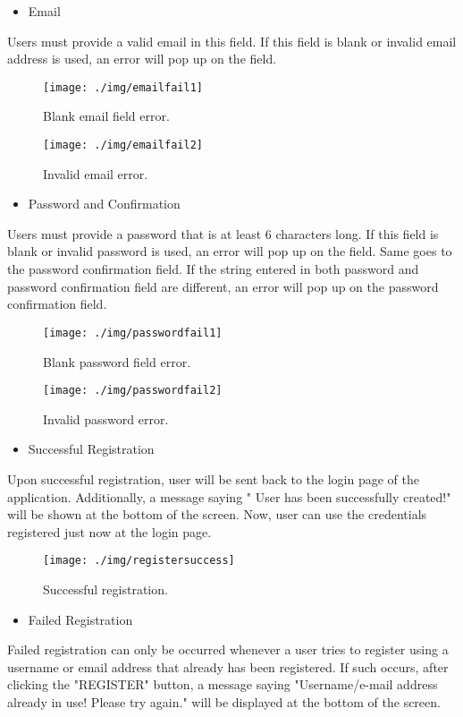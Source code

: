 \documentclass[conference]{IEEEtran}
\begin{document}
\begin{itemize}
\item Email
\end{itemize}
Users must provide a valid email in this field. If this field is blank or invalid email address is used, an error will pop up on the field. \\

\begin{figure}[h!]
\texttt{[image: ./img/emailfail1]}
\centering
\caption{Blank email field error.}
\end{figure}

\begin{figure}[h!]
\texttt{[image: ./img/emailfail2]}
\centering
\caption{Invalid email error.}
\end{figure}

\begin{itemize}
\item Password and Confirmation
\end{itemize}
Users must provide a password that is at least 6 characters long. If this field is blank or invalid password is used, an error will pop up on the field. Same goes to the password confirmation field. If the string entered in both password and password confirmation field are different, an error will pop up on the password confirmation field.

\begin{figure}[h!]
\texttt{[image: ./img/passwordfail1]}
\centering
\caption{Blank password field error.}
\end{figure}

\begin{figure}[h!]
\texttt{[image: ./img/passwordfail2]}
\centering
\caption{Invalid password error.}
\end{figure}

\begin{itemize}
\item Successful Registration
\end{itemize}
Upon successful registration, user will be sent back to the login page of the application. Additionally, a message saying " User has been successfully created!" will be shown at the bottom of the screen. Now, user can use the credentials registered just now at the login page.

\begin{figure}[h!]
\texttt{[image: ./img/registersuccess]}
\centering
\caption{Successful registration.}
\end{figure}
\begin{itemize}
\item Failed Registration
\end{itemize}
Failed registration can only be occurred whenever a user tries to register using a username or email address that already has been registered. If such occurs, after clicking the "REGISTER" button, a message saying "Username/e-mail address already in use! Please try again." will be displayed at the bottom of the screen.
\end{document}

